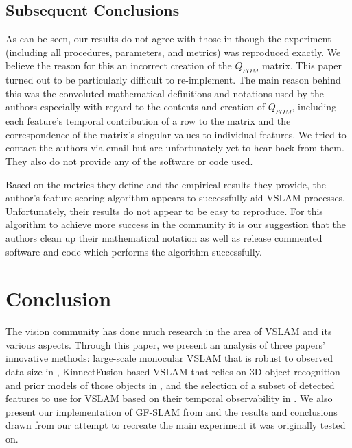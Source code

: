\documentclass[10pt,twocolumn,letterpaper]{article}
\begin{document}
\subsection{Subsequent Conclusions}
As can be seen, our results do not agree with those in \cite{Zhang_2015_CVPR} though the experiment (including all procedures, parameters, and metrics) was reproduced exactly. We believe the reason for this an incorrect creation of the $Q_{SOM}$ matrix. This paper turned out to be particularly difficult to re-implement. The main reason behind this was the convoluted mathematical definitions and notations used by the authors especially with regard to the contents and creation of $Q_{SOM}$, including each feature's temporal contribution of a row to the matrix and the correspondence of the matrix's singular values to individual features. We tried to contact the authors via email but are unfortunately yet to hear back from them. They also do not provide any of the software or code used.

Based on the metrics they define and the empirical results they provide, the author's feature scoring algorithm appears to successfully aid VSLAM processes. Unfortunately, their results do not appear to be easy to reproduce. For this algorithm to achieve more success in the community it is our suggestion that the authors clean up their mathematical notation as well as release commented software and code which performs the algorithm successfully.    

\section{Conclusion}
The vision community has done much research in the area of VSLAM and its various aspects. Through this paper, we present an analysis of three papers' innovative methods: large-scale monocular VSLAM that is robust to observed data size in \cite{Bourmaud_2015_CVPR}, KinnectFusion-based VSLAM that relies on 3D object recognition and prior models of those objects in \cite{Salas-Moreno_2013_CVPR}, and the selection of a subset of detected features to use for VSLAM based on their temporal observability in \cite{Zhang_2015_CVPR}. We also present our implementation of GF-SLAM from \cite{Zhang_2015_CVPR} and the results and conclusions drawn from our attempt to recreate the main experiment it was originally tested on. 

{\small


}
\end{document}
